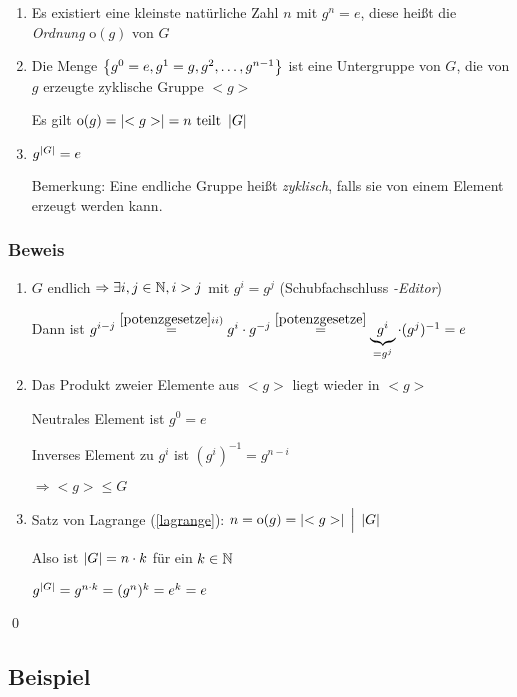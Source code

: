 {\renewcommand{\labelenumi}{(\roman{enumi})}
\begin{enumerate}
	\item
	Es existiert eine kleinste natürliche Zahl $n$ mit $g^n = e$, diese heißt die \emph{Ordnung} $\mathrm{o}(g)$ von $G$ 
	
	\item
	Die Menge $\left\{g^0 = e, g^1 = g, g^2, \dots, g^{n-1}\right\}$ ist eine Untergruppe von $G$, die von $g$ erzeugte zyklische Gruppe $<g>$
	
	Es gilt $\mathrm{o}(g) = \left|<g>\right| = n \text{ teilt } \left|G\right|$
	
	\item
	$g^{\left|G\right|} = e$
	
	Bemerkung: Eine endliche Gruppe heißt \emph{zyklisch}, falls sie von einem Element erzeugt werden kann.
\end{enumerate}

\subsubsection*{Beweis}

\begin{enumerate}
	\item
	$G$ endlich $\Rightarrow \exists i, j \in \mathbb{N}, i > j$ mit $g^i=g^j$ \quad(Schubfachschluss \emph{-Editor})
	
	Dann ist $g^{i-j} \stackrel{\ref{potenzgesetze} ii)}{=} g^i \cdot g^{-j} \stackrel{\ref{potenzgesetze}}{=}\underbrace{g^i}_{=g^j} \cdot (g^j)^{-1} = e$
	
	\item
	Das Produkt zweier Elemente aus $<g>$ liegt wieder in $<g>$
	
	Neutrales Element ist $g^0 = e$
	
	Inverses Element zu $g^i$ ist $(g^i)^{-1} = g^{n-i}$
	
	$\Rightarrow <g> \leqslant G$
	
	\item
	Satz von Lagrange (\ref{lagrange}): $n = \mathrm{o}(g)= \left|<g>\right| \;\Big|\; \left|G\right|$
	
	Also ist $\left|G\right| = n \cdot k$ für ein $k \in \mathbb{N}$
	
	$g^{\left|G\right|} = g^{n \cdot k} = (g^{n})^k = e^k = e$ 
\end{enumerate}} \qed


\subsection{Beispiel}

